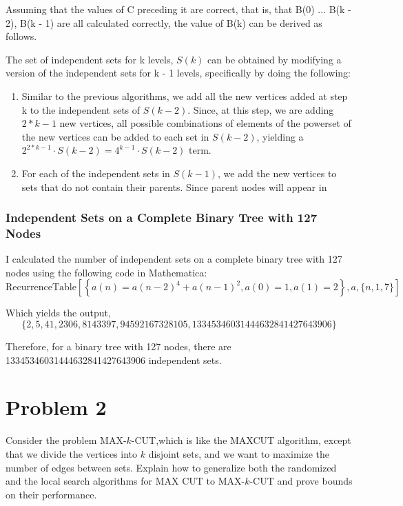 \documentclass[11pt]{article}
\begin{document}
Assuming that the values of C preceding it are correct, that is, that B(0) ... B(k - 2), B(k - 1) are all calculated correctly, the value of B(k) can be derived as follows. 

The set of independent sets for k levels, $S(k)$ can be obtained by modifying a version of the independent sets for k - 1 levels, specifically by doing the following:\begin{enumerate}
	\item Similar to the previous algorithms, we add all the new vertices added at step k to the independent sets of $S(k-2)$. Since, at this step, we are adding $2*{k-1}$ new vertices, all possible combinations of elements of the powerset of the new vertices can be added to each set in $S(k-2)$, yielding a $2^{2*{k-1}}\cdot S(k-2) = 4^{k-1}\cdot S(k-2)$ term.
	\item For each of the independent sets in $S(k-1)$, we add the new vertices to sets that do not contain their parents. Since parent nodes will appear in 
	\end{enumerate}
\subsubsection{Independent Sets on a Complete Binary Tree with 127 Nodes}

I calculated the number of independent sets on a complete binary tree with 127 nodes using the following code in Mathematica:
\begin{displaymath}
\text{RecurrenceTable}\left[\left\{a(n)=a(n-2)^4+a(n-1)^2,a(0)=1,a(1)=2\right\},a,\{n,1,7\}\right]
\end{displaymath}

Which yields the output, 
\begin{displaymath}
	\{2,5,41,2306,8143397,94592167328105,13345346031444632841427643906\}
\end{displaymath}

Therefore, for a binary tree with 127 nodes, there are 13345346031444632841427643906 independent sets.


\section{Problem 2}
Consider the problem MAX-$k$-CUT,which is like the MAXCUT algorithm, except that we divide the vertices into $k$ disjoint sets, and we want to maximize the number of edges between sets. Explain how to generalize both the randomized and the local search algorithms for MAX CUT to MAX-$k$-CUT and prove bounds on their performance.
\end{document}
